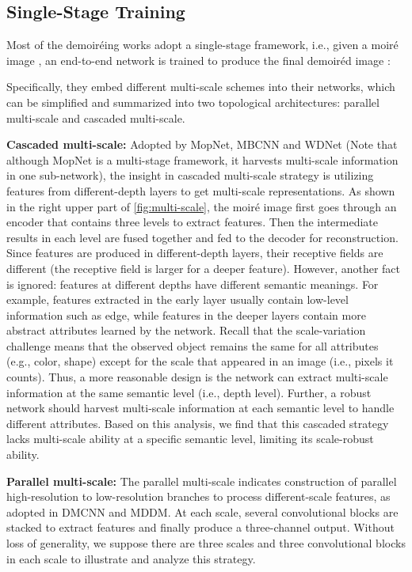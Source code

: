 \documentclass[runningheads]{llncs}
\newcommand{\ie}{i.e.}
\newcommand{\eg}{e.g.}
\begin{document}
\subsection{Single-Stage Training}
Most of the demoiréing works adopt a single-stage framework, \ie, given a moiré image , an end-to-end network  is trained to produce the final demoiréd image :

Specifically, they embed different multi-scale schemes into their networks, which can be simplified and summarized into two topological architectures: parallel multi-scale and cascaded multi-scale.

\noindent\textbf{Cascaded multi-scale:}
Adopted by MopNet\cite{he2019mop}, MBCNN\cite{zheng2020image} and WDNet\cite{liu2020wavelet} (Note that although MopNet is a multi-stage framework, it harvests multi-scale information in one sub-network), the insight in cascaded multi-scale strategy is utilizing features from different-depth layers to get multi-scale representations. As shown in the right upper part of \cref{fig:multi-scale}, the moiré image first goes through an encoder that contains three levels to extract features. Then the intermediate results in each level are fused together and fed to the decoder for reconstruction. Since features are produced in different-depth layers, their receptive fields are different (the receptive field is larger for a deeper feature). However, another fact is ignored: features at different depths have different semantic meanings. For example, features extracted in the early layer usually contain low-level information such as edge, while features in the deeper layers contain more abstract attributes learned by the network. Recall that the scale-variation challenge means that the observed object remains the same for all attributes (\eg,  color, shape) except for the scale that appeared in an image (\ie,  pixels it counts). Thus, a more reasonable design is the network can extract multi-scale information at the same semantic level (\ie, depth level). Further, a robust network should harvest multi-scale information at each semantic level to handle different attributes. Based on this analysis, we find that this cascaded strategy lacks multi-scale ability at a specific semantic level, limiting its scale-robust ability.



\noindent\textbf{Parallel multi-scale:}
The parallel multi-scale indicates construction of parallel high-resolution to low-resolution branches to process different-scale features, as adopted in DMCNN\cite{sun2018moire} and MDDM\cite{cheng2019multi}. At each scale, several convolutional blocks are stacked to extract features and finally produce a three-channel output. Without loss of generality, we suppose there are three scales and three convolutional blocks in each scale to illustrate and analyze this strategy. 
\end{document}
